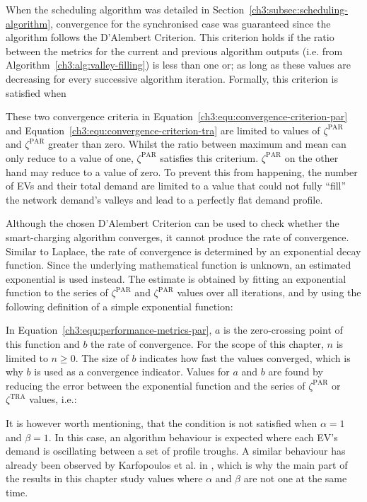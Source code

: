 When the scheduling algorithm was detailed in Section~\ref{ch3:subsec:scheduling-algorithm}, convergence for the synchronised case was guaranteed since the algorithm follows the D'Alembert Criterion.
This criterion holds if the ratio between the metrics for the current and previous algorithm outputs (i.e. from Algorithm~\ref{ch3:alg:valley-filling}) is less than one or; as long as these values are decreasing for every successive algorithm iteration.
Formally, this criterion is satisfied when



These two convergence criteria in Equation~\ref{ch3:equ:convergence-criterion-par} and Equation~\ref{ch3:equ:convergence-criterion-tra} are limited to values of $\zeta^\text{PAR}$ and $\zeta^\text{PAR}$ greater than zero.
Whilst the ratio between maximum and mean can only reduce to a value of one, $\zeta^\text{PAR}$ satisfies this criterium.
$\zeta^\text{PAR}$ on the other hand may reduce to a value of zero.
To prevent this from happening, the number of EVs and their total demand are limited to a value that could not fully ``fill'' the network demand's valleys and lead to a perfectly flat demand profile.

Although the chosen D'Alembert Criterion can be used to check whether the smart-charging algorithm converges, it cannot produce the rate of convergence.
Similar to Laplace, the rate of convergence is determined by an exponential decay function.
Since the underlying mathematical function is unknown, an estimated exponential is used instead.
The estimate is obtained by fitting an exponential function to the series of $\zeta^\text{PAR}$ and $\zeta^\text{PAR}$ values over all iterations, and by using the following definition of a simple exponential function:



In Equation~\ref{ch3:equ:performance-metrics-par}, $a$ is the zero-crossing point of this function and $b$ the rate of convergence.
For the scope of this chapter, $n$ is limited to $n \geq 0$.
The size of $b$ indicates how fast the values converged, which is why $b$ is used as a convergence indicator.
Values for $a$ and $b$ are found by reducing the error between the exponential function and the series of $\zeta^\text{PAR}$ or $\zeta^\text{TRA}$ values, i.e.:



It is however worth mentioning, that the condition is not satisfied when $\alpha = 1$ and $\beta = 1$.
In this case, an algorithm behaviour is expected where each EV's demand is oscillating between a set of profile troughs.
A similar behaviour has already been observed by Karfopoulos et al. in \cite{Karfopoulos2013}, which is why the main part of the results in this chapter study values where $\alpha$ and $\beta$ are not one at the same time.

